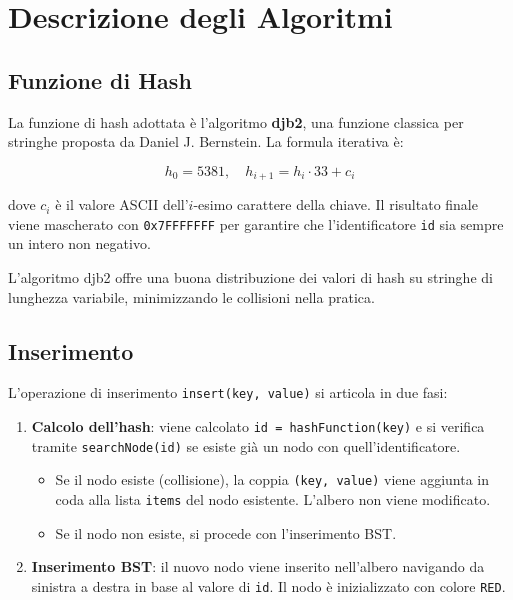 \chapter{Descrizione degli Algoritmi}

\section{Funzione di Hash}

La funzione di hash adottata è l'algoritmo \textbf{djb2}, una funzione classica 
per stringhe proposta da Daniel J. Bernstein. La formula iterativa è:

\begin{equation}
    h_0 = 5381, \quad h_{i+1} = h_i \cdot 33 + c_i
\end{equation}

dove $c_i$ è il valore ASCII dell'$i$-esimo carattere della chiave. Il risultato 
finale viene mascherato con \texttt{0x7FFFFFFF} per garantire che l'identificatore 
\texttt{id} sia sempre un intero non negativo.

L'algoritmo djb2 offre una buona distribuzione dei valori di hash su stringhe 
di lunghezza variabile, minimizzando le collisioni nella pratica.

\section{Inserimento}

L'operazione di inserimento \texttt{insert(key, value)} si articola in due fasi:

\begin{enumerate}
    \item \textbf{Calcolo dell'hash}: viene calcolato \texttt{id = hashFunction(key)} 
    e si verifica tramite \texttt{searchNode(id)} se esiste già un nodo con 
    quell'identificatore.
    \begin{itemize}
        \item Se il nodo esiste (collisione), la coppia \texttt{(key, value)} 
        viene aggiunta in coda alla lista \texttt{items} del nodo esistente. 
        L'albero non viene modificato.
        \item Se il nodo non esiste, si procede con l'inserimento BST.
    \end{itemize}
    \item \textbf{Inserimento BST}: il nuovo nodo viene inserito nell'albero 
    navigando da sinistra a destra in base al valore di \texttt{id}. 
    Il nodo è inizializzato con colore \texttt{RED}.
\end{enumerate}

